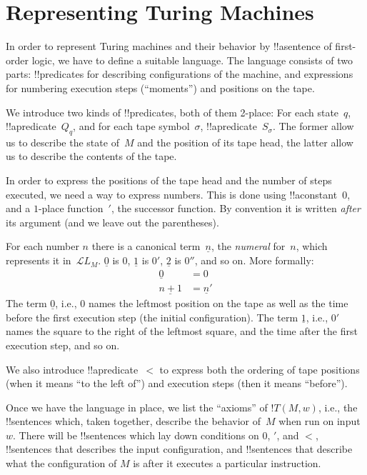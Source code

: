 \documentclass[10pt,a4paper]{article}
\theoremstyle{plain}
\theoremstyle{definition}
\theoremstyle{remark}
\newenvironment{explain}{}{}
\newcommand*{\olfileid}[3]{}
\newcommand*{\olsection}[1]{\section*{#1}}
\providecommand{\Obj}{}
\providecommand{\Lang}{\ensuremath{\mathcal{L}}}
\providecommand{\num}[1]{\underline{#1}}
\begin{document}



\olfileid{tur}{und}{rep}
\olsection{Representing Turing Machines}

\begin{explain}
In order to represent Turing machines and their behavior by !!a{sentence}
of first-order logic, we have to define a suitable language. The
language consists of two parts: !!{predicate}s for describing
configurations of the machine, and expressions for numbering execution
steps (``moments'') and positions on the tape.

We introduce two kinds of !!{predicate}s, both of them 2-place: For
each state~$q$, !!a{predicate}~$\Obj Q_q$, and for each tape
symbol~$\sigma$, !!a{predicate}~$\Obj S_\sigma$. The former allow us
to describe the state of~$M$ and the position of its tape head, the
latter allow us to describe the contents of the tape.  

In order to express the positions of the tape head and the number of
steps executed, we need a way to express numbers. This is done using
!!a{constant}~$\Obj 0$, and a $1$-place function~$\prime$, the
successor function. By convention it is written \emph{after} its
argument (and we leave out the parentheses).

For each number $n$ there is a canonical term~$\num{n}$, the
\emph{numeral} for~$n$, which represents it in~$\Lang L_M$. $\num{0}$
is $\Obj 0$, $\num{1}$ is $\Obj 0'$, $\num{2}$ is $\Obj 0''$, and so
on. More formally:
\begin{align*}
\num{0} & = \Obj 0 \\
\num{n+1} &= \num{n}'
\end{align*}
The term $\num{0}$, i.e., $\Obj 0$ names the leftmost position on the
tape as well as the time before the first execution step (the initial
configuration). The term $\num{1}$, i.e., $\Obj 0'$ names the square
to the right of the leftmost square, and the time after the first
execution step, and so on.

We also introduce !!a{predicate}~$<$ to express both the ordering of
tape positions (when it means ``to the left of'') and execution steps
(then it means ``before'').

Once we have the language in place, we list the ``axioms'' of $!T(M,
w)$, i.e., the !!{sentence}s which, taken together, describe the
behavior of~$M$ when run on input~$w$.  There will be !!{sentence}s
which lay down conditions on $\Obj 0$, $\prime$, and $<$,
!!{sentence}s that describes the input configuration, and
!!{sentence}s that describe what the configuration of $M$ is after it
executes a particular instruction.
\end{explain}
\end{document}
